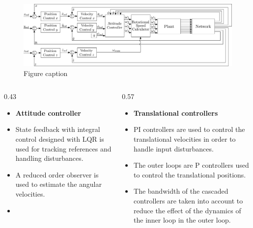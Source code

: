 \vspace{-1cm}
\begin{figure}
	\includegraphics[width=0.88\linewidth]{figures/TranslationalControlDiagram}
	\caption{Figure caption}
\end{figure}

\begin{columns}[t,totalwidth=\twocolwid] %

	\begin{column}{0.43\twocolwid} %
  	 \centering
  	 \hspace{-2cm}
  	 \parbox{.88\textwidth}{
    	 \begin{itemize}
  	 			\item[]\textbf{Attitude controller}\\
  	 			\item State feedback with integral control designed with LQR is used for tracking references and handling disturbances.
  	 			\item A reduced order observer is used to estimate the angular velocities.
  	 			\item[]\vspace{5pt}
  	 		\end{itemize}
  	 }
	\end{column} %
	\hspace{-4cm}
	\begin{column}{0.57\twocolwid} %
  	 \centering
   	 \parbox{1\textwidth}{
       	 \begin{itemize}
    	 			\item[]\textbf{Translational controllers}\\
     	 			\item PI controllers are used to control the translational velocities in order to handle input disturbances.
     	 			\item The outer loops are P controllers used to control the translational positions.
     	 			\item The bandwidth of the cascaded controllers are taken into account to reduce the effect of the dynamics of the inner loop in the outer loop.
       	 \end{itemize}		
   	 }
	\end{column} %
	\vspace{-.5cm}
\end{columns} %